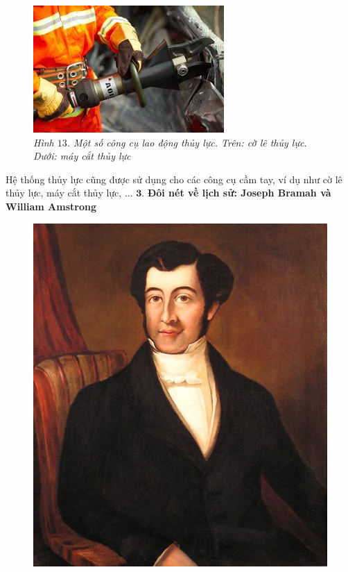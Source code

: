 \begin{multicols}{2}
\begin{figure}[H]
		\vspace*{4pt}
		\includegraphics[width= 1\linewidth]{25}
		\caption{\small\textit{\color{timhieukhoahoc}Hình $13$. Một số công cụ lao động thủy lực. Trên: cờ lê thủy lực. Dưới: máy cắt thủy lực}}
		\vspace*{-10pt}
	\end{figure}
	Hệ thống thủy lực cũng được sử dụng cho các công cụ cầm tay, ví dụ như cờ lê thủy lực, máy cắt thủy lực, ... 
	\vskip 0.1cm
	$\pmb{3.}$ \textbf{\color{timhieukhoahoc}Đôi nét về lịch sử: Joseph Bramah và William Amstrong}
	\begin{figure}[H]
		\vspace*{-5pt}
		\centering
		\captionsetup{labelformat= empty, justification=centering}
		\includegraphics[width= 1\linewidth]{26}

\end{figure}
\end{multicols}
